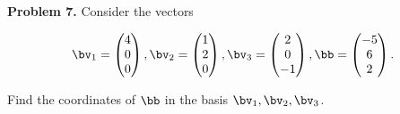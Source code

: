 \documentclass[oneside,12pt]{amsart}
\begin{document}
\newpage

\textbf{Problem 7.} Consider the vectors

$$
\bv_1 =
\begin{pmatrix}
4 \\ 0 \\0
\end{pmatrix},
\bv_2 =
\begin{pmatrix}
1 \\ 2 \\ 0
\end{pmatrix},
\bv_3 =
\begin{pmatrix}
2 \\ 0 \\ -1
\end{pmatrix},
\bb =
\begin{pmatrix}
-5 \\ 6 \\ 2
\end{pmatrix}.
$$

Find the coordinates of $\bb$ in the basis $\bv_1,\bv_2,\bv_3$.
\end{document}

